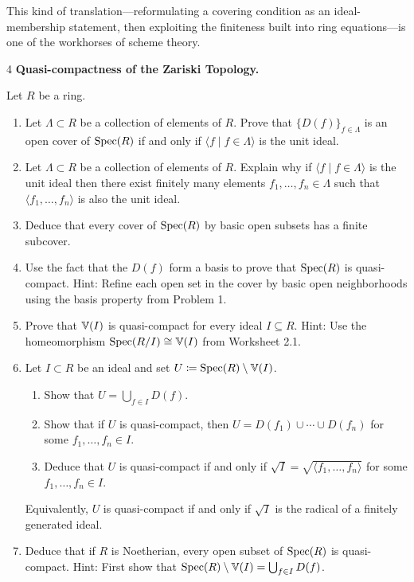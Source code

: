 \documentclass[Notebook.tex]{subfiles}
\begin{document}
This kind of translation---reformulating a covering condition as an ideal-membership statement, then exploiting the finiteness built into ring equations---is one of the workhorses of scheme theory.

\hrulefill

\newpage

\begin{problem}{4}
    \textbf{Quasi-compactness of the Zariski Topology.} 
    
    Let $R$ be a ring.
    \begin{enumerate}
        \item Let $\Lambda \subset R$ be a collection of elements of $R$. Prove that $\{D(f)\}_{f\in \Lambda}$ is an open cover of $\operatorname{Spec}(R)$ if and only if $\langle f \mid f\in \Lambda\rangle$ is the unit ideal.
        \item Let $\Lambda \subset R$ be a collection of elements of $R$. Explain why if $\langle f \mid f\in \Lambda\rangle$ is the unit ideal then there exist finitely many elements $f_{1},\ldots,f_{n} \in \Lambda$ such that $\langle f_{1},\ldots,f_{n} \rangle$ is also the unit ideal.
        \item Deduce that every cover of $\operatorname{Spec}(R)$ by basic open subsets has a finite subcover.
        \item Use the fact that the $D(f)$ form a basis to prove that $\operatorname{Spec}(R)$ is quasi-compact. Hint: Refine each open set in the cover by basic open neighborhoods using the basis property from Problem 1. 
        \item Prove that $\mathbb V(I)$ is quasi-compact for every ideal $I\subseteq R$. Hint: Use the homeomorphism $\operatorname{Spec}(R/I)\cong \mathbb V(I)$ from Worksheet 2.1.
        \item Let $I \subset R$ be an ideal and set $U \coloneqq \operatorname{Spec}(R)\setminus \mathbb V(I)$.
        \begin{enumerate}
            \item Show that $U=\bigcup_{f\in I} D(f)$.
            \item Show that if $U$ is quasi-compact, then $U=D(f_1)\cup\cdots\cup D(f_n)$ for some $f_1,\ldots,f_n\in I$.
            \item Deduce that $U$ is quasi-compact if and only if $\sqrt{I}=\sqrt{\langle f_1,\ldots,f_n\rangle}$ for some $f_1,\ldots,f_n\in I$.
        \end{enumerate}
        Equivalently, $U$ is quasi-compact if and only if $\sqrt{I}$ is the radical of a finitely generated ideal.
        \item Deduce that if $R$ is Noetherian, every open subset of $\operatorname{Spec}(R)$ is quasi-compact. Hint: First show that $\operatorname{Spec}(R)\setminus \mathbb V(I)=\bigcup_{f\in I} D(f)$.
    \end{enumerate}
\end{problem}
\end{document}
